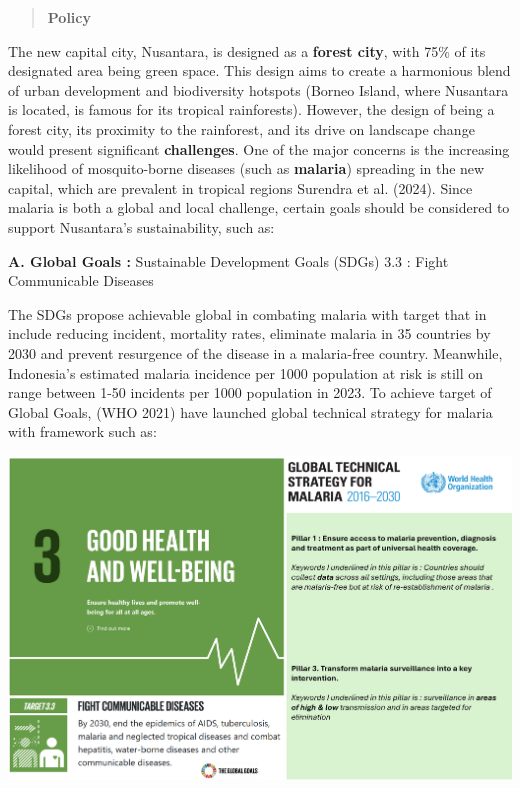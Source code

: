 \documentclass[
  letterpaper,
  DIV=11,
  numbers=noendperiod]{scrreprt}
\begin{document}
\begin{quote}
\textbf{Policy}
\end{quote}

The new capital city, Nusantara, is designed as a \textbf{forest city},
with 75\% of its designated area being green space. This design aims to
create a harmonious blend of urban development and biodiversity hotspots
(Borneo Island, where Nusantara is located, is famous for its tropical
rainforests). However, the design of being a forest city, its proximity
to the rainforest, and its drive on landscape change would present
significant \textbf{challenges}. One of the major concerns is the
increasing likelihood of mosquito-borne diseases (such as
\textbf{malaria}) spreading in the new capital, which are prevalent in
tropical regions Surendra et al. (2024). Since malaria is both a global
and local challenge, certain goals should be considered to support
Nusantara's sustainability, such as:

\textbf{A. Global Goals :} Sustainable Development Goals (SDGs) 3.3 :
Fight Communicable Diseases

The SDGs propose achievable global in combating malaria with target that
in include reducing incident, mortality rates, eliminate malaria in 35
countries by 2030 and prevent resurgence of the disease in a
malaria-free country. Meanwhile, Indonesia's estimated malaria incidence
per 1000 population at risk is still on range between 1-50 incidents per
1000 population in 2023. To achieve target of Global Goals, (WHO 2021)
have launched global technical strategy for malaria with framework such
as:

\includegraphics[width=7.76042in,height=\textheight]{images/clipboard-2410472720.png}
\end{document}
